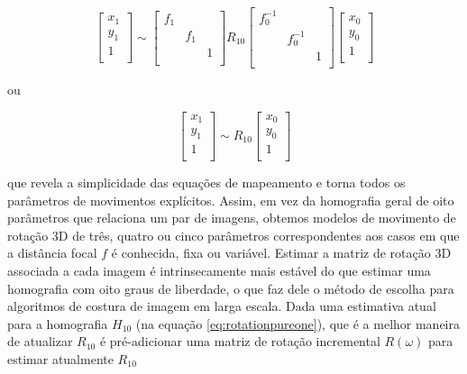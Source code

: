 \documentclass{article}
\begin{document}
\begin{equation}\label{eq:rotationpureone}
\begin{bmatrix}
x_{1}\\
y_{1}\\
1\\
\end{bmatrix}\sim
\begin{bmatrix}
f_{1} & &  \\
 & f_{1} & \\
 &  & 1\\
\end{bmatrix}R_{10}
\begin{bmatrix}
f^{-1}_{0} & &  \\
& f^{-1}_{0} & \\
&  & 1\\
\end{bmatrix}
\begin{bmatrix}
x_{0}\\
y_{0}\\
1\\
\end{bmatrix}
\end{equation}

ou

\begin{equation}
\begin{bmatrix}
x_{1}\\
y_{1}\\
1\\
\end{bmatrix}\sim
R_{10}
\begin{bmatrix}
x_{0}\\
y_{0}\\
1\\
\end{bmatrix}
\end{equation}

que revela a simplicidade das equações de mapeamento e torna todos os parâmetros
de movimentos explícitos. Assim, em vez da homografia geral de oito parâmetros que relaciona um par de imagens, obtemos modelos de movimento de rotação 3D de três, quatro ou cinco parâmetros correspondentes aos casos em que a distância focal $f$ é conhecida, fixa ou variável. Estimar a matriz de rotação 3D associada a cada imagem é intrinsecamente mais estável do que estimar uma homografia com oito graus de liberdade, o que faz dele o método de escolha para algoritmos de costura de imagem em larga escala. Dada uma estimativa atual para a homografia $H_{10}$ (na equação \ref{eq:rotationpureone}), que é a melhor maneira de atualizar $R_{10}$ é pré-adicionar uma matriz de rotação incremental $R(\omega)$ para estimar atualmente $R_{10}$
\end{document}

